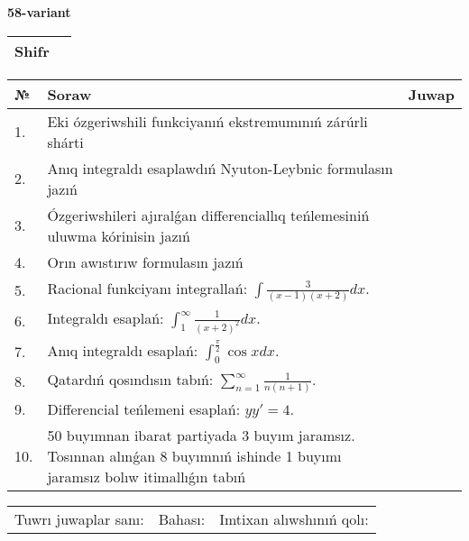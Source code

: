 \documentclass{article}
\begin{document}
  \egroup
  
  \newpage
  
  
  \textbf{58-variant}\\
  
  \bgroup
  \def\arraystretch{1.6} %
  
  \begin{tabular}{|m{5.7cm}|m{9.5cm}|}
  \hline
  Shifr & \\
  \hline
  \end{tabular}
  
  \vspace{1cm}
  
  \begin{tabular}{|m{0.7cm}|m{10cm}|m{4cm}|}
  \hline
  № & Soraw & Juwap \\
  \hline
  1. & Eki ózgeriwshili funkciyanıń ekstremumınıń zárúrli shárti &  \\
  \hline
  2. & Anıq integraldı esaplawdıń Nyuton-Leybnic formulasın jazıń &  \\
  \hline
  3. & Ózgeriwshileri ajıralǵan differenciallıq teńlemesiniń uluwma kórinisin jazıń &  \\
  \hline
  4. & Orın awıstırıw formulasın jazıń &  \\
  \hline
  5. & Racional funkciyanı integrallań: \(\int{\frac{3}{(x - 1)(x + 2)}dx}\). &  \\
  \hline
  6. & Integraldı esaplań: \(\int_{1}^{\infty}{\frac{1}{(x + 2)^2 }dx}\). &  \\
  \hline
  7. & Anıq integraldı esaplań: \(\int_{0}^{\frac{\pi}{2}}{\cos xdx}\). &  \\
  \hline
  8. & Qatardıń qosındısın tabıń: \(\sum_{n = 1}^{\infty}\frac{1}{n(n + 1)}\). &  \\
  \hline
  9. & Differencial teńlemeni esaplań: \(yy' = 4\). &  \\
  \hline
  10. & 50 buyımnan ibarat partiyada 3 buyım jaramsız. Tosınnan alınǵan 8 buyımnıń ishinde 1 buyımı jaramsız bolıw itimallıǵın tabıń &  \\
  \hline
  \end{tabular}
  
  \vspace{1cm}
  
  \begin{tabular}{lll}
  Tuwrı juwaplar sanı: \underline{\hspace{1.5cm}} & 
  Bahası: \underline{\hspace{1.5cm}} & 
  Imtixan alıwshınıń qolı: \underline{\hspace{2cm}} \\
  \end{tabular}
  
\end{document}
